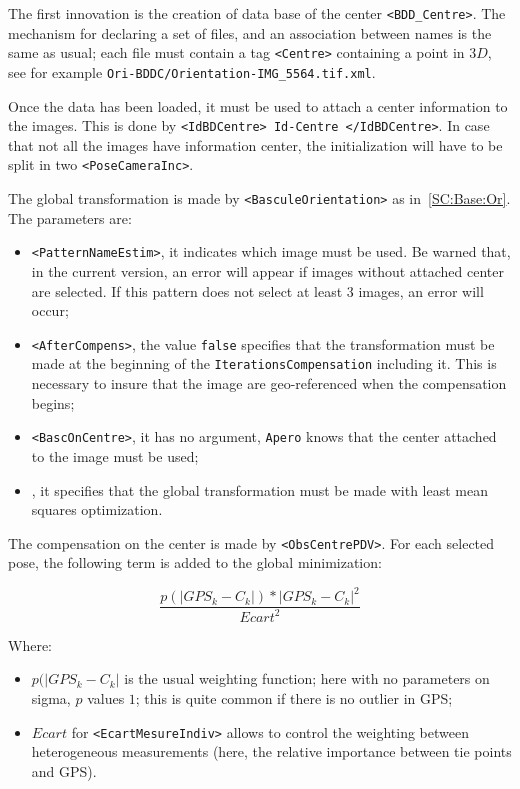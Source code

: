The first innovation is the creation of data base of the center {\tt <BDD\_Centre>}.
The mechanism for declaring a set of files, and an association between names
is the same as usual; each file must contain a tag {\tt  <Centre>}
containing a point in $3D$, see for example {\tt Ori-BDDC/Orientation-IMG\_5564.tif.xml}.

Once the data has been loaded, it must be used to attach a center information
to the images. This is done by  {\tt  <IdBDCentre> Id-Centre </IdBDCentre>}.
In case that not all the images have information center, the
initialization will have to be split in two {\tt <PoseCameraInc>}.

The global transformation is made by {\tt  <BasculeOrientation>} as in~\ref{SC:Base:Or}.
The parameters are:


\begin{itemize}
   \item {\tt <PatternNameEstim>}, it indicates which image must be used. Be warned that, in the
          current version, an error will appear if images without attached center are selected.
          If this pattern does not select at least $3$ images, an error will occur;

   \item  {\tt  <AfterCompens>}, the value {\tt false} specifies that the transformation
          must be made at the beginning of the {\tt IterationsCompensation} including it. This
          is necessary to insure that the image are geo-referenced when the compensation begins;

    \item {\tt  <BascOnCentre>}, it has no argument, {\tt Apero} knows that the center attached to
          the image must be used;

    \item {\tt <ModeL2>}, it specifies that the global transformation must be made with least mean
          squares optimization.

\end{itemize}


The compensation on the center is made by {\tt <ObsCentrePDV>}. For each selected pose,
the following term is added to the global minimization:


\begin{equation}
       \frac{p(|GPS_k-C_k|) * |GPS_k-C_k|^2}{Ecart^2}
\end{equation}

Where:

\begin{itemize}
    \item $p(|GPS_k-C_k|$ is the usual weighting function; here with no parameters on sigma,
          $p$ values $1$; this is quite common if there is no outlier in GPS;


    \item $Ecart$ for {\tt <EcartMesureIndiv>} allows to control the weighting between
          heterogeneous measurements (here, the relative importance between tie points and GPS).
\end{itemize}


